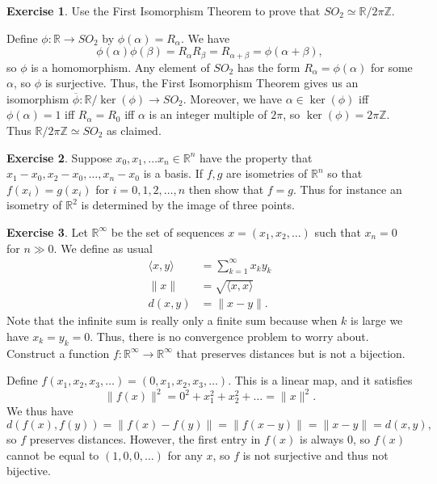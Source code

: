 \documentclass{amsart}
\newcommand{\xra}{\xrightarrow}
\renewcommand{\:}{\colon}
\newcommand{\ov}{\overline}
\newcommand{\ip}[1]{\langle #1\rangle}
\newcommand{\Z}{\mathbb{Z}}
\newcommand{\R}{\mathbb{R}}
\newcommand{\al}        {\alpha}
\newcommand{\bt}        {\beta}
\theoremstyle{definition}
\newtheorem{exercise}{Exercise}
\newenvironment{solution}{{\noindent\bf Solution:}}{}
\begin{document}
\begin{exercise}
 Use the First Isomorphism Theorem to prove that $SO_2\simeq\R/2\pi\Z$.
\end{exercise}
\begin{solution}
 Define $\phi\:\R\xra{}SO_2$ by $\phi(\al)=R_\al$.  We have
 \[ \phi(\al)\phi(\bt)=R_\al R_\bt=R_{\al+\bt}=\phi(\al+\bt), \]
 so $\phi$ is a homomorphism.  Any element of $SO_2$ has the form
 $R_\al=\phi(\al)$ for some $\al$, so $\phi$ is surjective.  Thus, the
 First Isomorphism Theorem gives us an isomorphism
 $\ov{\phi}\:\R/\ker(\phi)\xra{}SO_2$.  Moreover, we have
 $\al\in\ker(\phi)$ iff $\phi(\al)=1$ iff $R_\al=R_0$ iff $\al$ is an
 integer multiple of $2\pi$, so $\ker(\phi)=2\pi\Z$.  Thus
 $\R/2\pi\Z\simeq SO_2$ as claimed.
\end{solution}

\begin{exercise}
 Suppose $x_0,x_1,\ldots x_n\in\R^n$ have the property that
 $x_1-x_0,x_2-x_0,\ldots,x_n-x_0 $ is a basis. If $f,g$ are isometries
 of $\R^n$ so that $f(x_i)=g(x_i)$ for $i=0,1,2,\ldots,n$ then show
 that $f=g$. Thus for instance an isometry of $\R^2$ is determined by
 the image of three points.
\end{exercise}
\begin{solution}

\end{solution}

\begin{exercise}
 Let $\R^\infty$ be the set of sequences $x=(x_1,x_2,\ldots)$ such that
 $x_n=0$ for $n\gg 0$.  We define as usual
 \begin{align*}
  \ip{x,y} &= \sum_{k=1}^\infty x_k y_k \\
  \|x\|    &= \sqrt{\ip{x,x}} \\
  d(x,y)   &= \|x-y\|. 
 \end{align*}
 Note that the infinite sum is really only a finite sum because when
 $k$ is large we have $x_k=y_k=0$.  Thus, there is no convergence
 problem to worry about.  Construct a function
 $f\:\R^\infty\xra{}\R^\infty$ that preserves distances but is not a
 bijection. 
\end{exercise}
\begin{solution}
 Define $f(x_1,x_2,x_3,\ldots)=(0,x_1,x_2,x_3,\ldots)$.  This is a
 linear map, and it satisfies
 \[ \|f(x)\|^2 = 0^2 + x_1^2 + x_2^2 + \ldots = \|x\|^2. \]
 We thus have 
 \[ d(f(x),f(y))=\|f(x)-f(y)\|=\|f(x-y)\|=\|x-y\|=d(x,y), \]
 so $f$ preserves distances.  However, the first entry in $f(x)$ is
 always $0$, so $f(x)$ cannot be equal to $(1,0,0,\ldots)$ for any
 $x$, so $f$ is not surjective and thus not bijective.
\end{solution}
\end{document}
